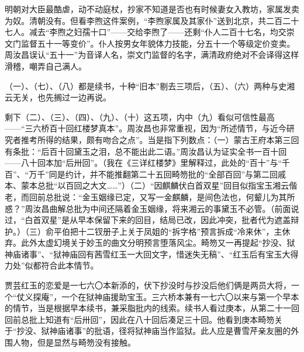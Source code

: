 \par 明朝对大臣最酷虐，动不动庭杖，抄家不知道是否也有时候妻女入教坊，家属发卖为奴。清朝没有。但看李煦这件案例，“李煦家属及其家仆”送到北京，共二百二十七人。减去“李煦之妇孺十口”——交给李煦了——还剩“仆人二百十七名，均交崇文门监督五十一等变价”。仆人按男女年貌体力技能，分五十一个等级定价变卖。周汝昌误认“五十一”为音译人名，崇文门监督的名字，满清政府绝对不会译得这样滑稽，嘲弄自己满人。
\par （一）、（七）、（八）都是续书，十种“旧本”剔去三项后，（五）、（六）两种与史湘云无关，也先搁过一边再说。
\par 剩下（二）、（三）、（四）、（九）、（十）这五项，内中（九）看似可信性最高——“三六桥百十回红楼梦真本”。周汝昌也非常重视，因为“所述情节，与近今研究者推考所得的结果，颇有吻合之点”。当是指下列数点：（一）蒙古王府本第三回有条批：“后百十回黛玉之泪，总不能出此二语。”周汝昌认为证实全书一百十回——八十回本加“后卅回”。（我在《三详红楼梦》里解释过，此处的“百十”与“千百”、“万千”同是约计，并不能推翻第二十五回畸笏批的“全部百回”与第二回戚本、蒙本总批“以百回之大文……”）（二）“因麒麟伏白首双星”回目似指宝玉湘云偕老，而回前总批说：“金玉姻缘已定，又写一金麒麟，是间色法也，何颦儿为其所惑？”周汝昌曲解总批为中间还隔着金玉姻缘，将来湘云的事黛玉不必管。（前面说过，“白首双星”是从早本保留下来的回目，结局已改，因此冲突，批者代为遮盖辩护。）（三）俞平伯把十二钗册子上关于凤姐的“拆字格”预言拆成“冷来休”，主休弃。此外太虚幻境关于妙玉的曲文分明预言堕落风尘。畸笏又一再提起“抄没、狱神庙诸事”、“狱神庙回有茜雪红玉一大回文字，惜迷失无稿”、“红玉后有宝玉大得力处”似都符合此本情节。
\par 贾芸红玉的恋爱是一七六〇本新添的，伏下抄没时与抄没后他们俩是两员大将，一个“仗义探庵”，一个在狱神庙援助宝玉。三六桥本兼有一七六〇以来与第一个早本的情节，当是根据早本续书，兼采脂批内的线索。续书人看过庚本，从第二十一回回前总批上知道有“后卅回”，因此在八十回后凑足三十回。他看到庚本畸笏关于“抄没、狱神庙诸事”的批语，径将狱神庙当作监狱。此人应是曹雪芹亲友圈的外围人物，但是显然与畸笏没有接触。
